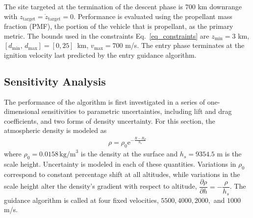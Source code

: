\documentclass[letterpaper, paper,11pt]{AAS}
\begin{document}
The site targeted at the termination of the descent phase is 700 km downrange with $z_{\mathrm{target}}=\dot{z}_{\mathrm{target}}=0$. 
Performance is evaluated using the propellant mass fraction (PMF), the portion of the vehicle that is propellant, as the primary metric. The bounds used in the constraints Eq.~\ref{eq_constraints} are $z_{\min} = 3$ km, $[d_{\min},\,d_{\max}] = [0, 25]\,$ km, $v_{\max} = 700 $ m/s. The entry phase terminates at the ignition velocity last predicted by the entry guidance algorithm.

\subsection{Sensitivity Analysis}
The performance of the algorithm is first investigated in a series of one-dimensional sensitivities to parametric uncertainties, including lift and drag coefficients, and two forms of density uncertainty. For this section, the atmospheric density is modeled as 
\begin{align}
\rho = \rho_0\mathrm{e}^{-\frac{R-R_P}{h_s}}
\end{align}
where $\rho_0 = 0.0158 \,\mathrm{kg/m}^3$ is the density at the surface and $h_s = 9354.5$ m is the scale height. Uncertainty is modeled in each of these quantities. Variations in $\rho_0$ correspond to constant percentage shift at all altitudes, while variations in the scale height alter the density's gradient with respect to altitude, $\dfrac{\partial\rho}{\partial h} = -\dfrac{\rho}{h_s}$. The guidance algorithm is called at four fixed velocities, $5500, 4000, 2000,$ and $1000$ m/s.
\end{document}
